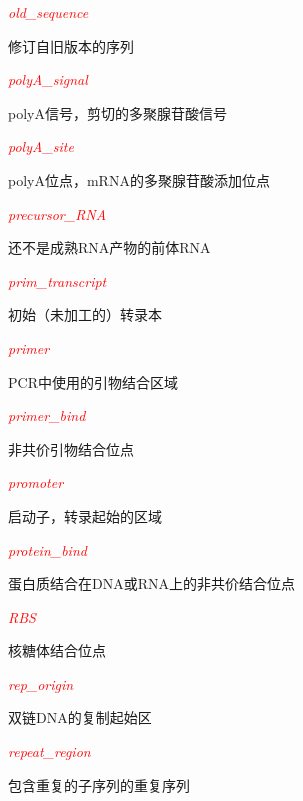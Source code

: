 \textcolor{red}{\textit{old\_sequence}}
\begin{adjustwidth}{4em}{}
修订自旧版本的序列
\end{adjustwidth}

\textcolor{red}{\textit{polyA\_signal}}
\begin{adjustwidth}{4em}{}
polyA信号，剪切的多聚腺苷酸信号
\end{adjustwidth}

\textcolor{red}{\textit{polyA\_site}}
\begin{adjustwidth}{4em}{}
polyA位点，mRNA的多聚腺苷酸添加位点
\end{adjustwidth}

\textcolor{red}{\textit{precursor\_RNA}}
\begin{adjustwidth}{4em}{}
还不是成熟RNA产物的前体RNA
\end{adjustwidth}

\textcolor{red}{\textit{prim\_transcript}}
\begin{adjustwidth}{4em}{}
初始（未加工的）转录本
\end{adjustwidth}

\textcolor{red}{\textit{primer}}
\begin{adjustwidth}{4em}{}
PCR中使用的引物结合区域
\end{adjustwidth}

\textcolor{red}{\textit{primer\_bind}}
\begin{adjustwidth}{4em}{}
非共价引物结合位点
\end{adjustwidth}

\textcolor{red}{\textit{promoter}}
\begin{adjustwidth}{4em}{}
启动子，转录起始的区域
\end{adjustwidth}

\textcolor{red}{\textit{protein\_bind}}
\begin{adjustwidth}{4em}{}
蛋白质结合在DNA或RNA上的非共价结合位点
\end{adjustwidth}

\textcolor{red}{\textit{RBS}}
\begin{adjustwidth}{4em}{}
核糖体结合位点
\end{adjustwidth}

\textcolor{red}{\textit{rep\_origin}}
\begin{adjustwidth}{4em}{}
双链DNA的复制起始区
\end{adjustwidth}

\textcolor{red}{\textit{repeat\_region}}
\begin{adjustwidth}{4em}{}
包含重复的子序列的重复序列
\end{adjustwidth}

